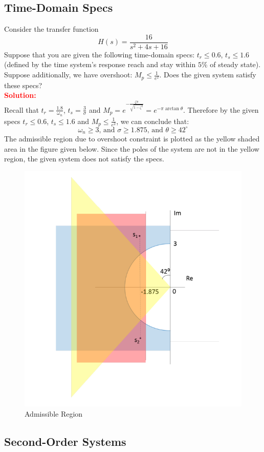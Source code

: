 \documentclass[12pt]{article}
\begin{document}
\subsection{Time-Domain Specs}
Consider the transfer function 
\[
H(s)=\frac{16}{s^2+4s+16}
\]
Suppose that you are given the following time-domain specs: $t_r \leq 0.6$, $t_s \leq 1.6$ (defined by the time system's response reach and stay within $5\%$ of steady state). Suppose additionally, we have overshoot: $M_p \leq \frac{1}{e^2}$. Does the given system satisfy these specs? \\
\textbf{\textcolor{red}{Solution:}} \\
Recall that $t_r=\frac{1.8}{\omega_n}$, $t_s=\frac{3}{\sigma}$ and $M_p =e^{-\frac{\zeta \pi}{\sqrt{1-\zeta^2}}}=e^{-\pi \arctan \theta}$. Therefore by the given specs $t_r \leq 0.6$, $t_s \leq 1.6$ and  $M_p \leq \frac{1}{e^2}$, we can conclude that:
\[
\omega_n \geq 3 \text{, and  } \sigma \geq 1.875 \text{, and  }  \theta \geq 42^\circ
\]
The admissible region due to overshoot constraint is plotted as the yellow shaded area in the figure given below. Since the poles of the system are not in the yellow region, the given system does not satisfy the specs.
\begin{figure}[H]
    \centering
    \includegraphics[width=0.65\linewidth]{figs/1.26.png}
    \caption{Admissible Region}
    \label{fig:prb43}
\end{figure}

\clearpage
\subsection{Second-Order Systems}
\end{document}
